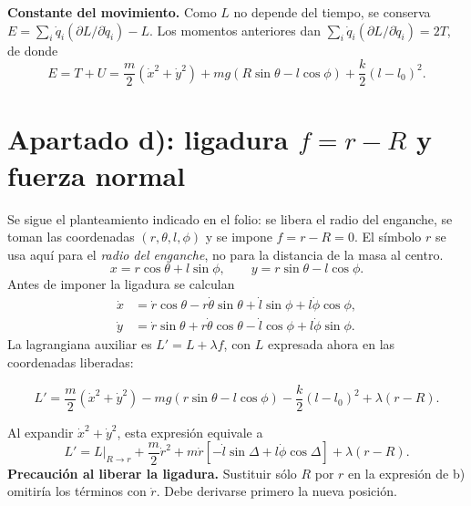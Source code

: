\documentclass[11pt,a4paper]{article}
\begin{document}
\textbf{Constante del movimiento.} Como $L$ no depende del tiempo, se conserva $E=\sum_i\dot q_i(\partial L/\partial\dot q_i)-L$. Los momentos anteriores dan $\sum_i\dot q_i(\partial L/\partial\dot q_i)=2T$, de donde
\begin{equation}
 \boxed{E=T+U=\frac m2(\dot x^2+\dot y^2)+mg(R\sin\theta-l\cos\phi)+\frac k2(l-l_0)^2.}
\end{equation}

\newpage
\section{Apartado d): ligadura \texorpdfstring{$f=r-R$}{f=r-R} y fuerza normal}
Se sigue el planteamiento indicado en el folio: se libera el radio del enganche, se toman las coordenadas $(r,\theta,l,\phi)$ y se impone $f=r-R=0$. El símbolo $r$ se usa aquí para el \emph{radio del enganche}, no para la distancia de la masa al centro.
\begin{equation}
 x=r\cos\theta+l\sin\phi,\qquad y=r\sin\theta-l\cos\phi.
\end{equation}
Antes de imponer la ligadura se calculan
\begin{align}
 \dot x&=\dot r\cos\theta-r\dot\theta\sin\theta+\dot l\sin\phi+l\dot\phi\cos\phi,\\
 \dot y&=\dot r\sin\theta+r\dot\theta\cos\theta-\dot l\cos\phi+l\dot\phi\sin\phi.
\end{align}
La lagrangiana auxiliar es $L'=L+\lambda f$, con $L$ expresada ahora en las coordenadas liberadas:
\begin{resultado}
\begin{equation}
 L'=\frac m2(\dot x^2+\dot y^2)-mg(r\sin\theta-l\cos\phi)-\frac k2(l-l_0)^2+\lambda(r-R).
\end{equation}
\end{resultado}
Al expandir $\dot x^2+\dot y^2$, esta expresión equivale a
\begin{equation}
 L'=L\big|_{R\to r}+\frac m2\dot r^2
 +m\dot r[-\dot l\sin\Delta+l\dot\phi\cos\Delta]+\lambda(r-R).
\end{equation}
\textbf{Precaución al liberar la ligadura.} Sustituir sólo $R$ por $r$ en la expresión de b) omitiría los términos con $\dot r$. Debe derivarse primero la nueva posición.
\end{document}
